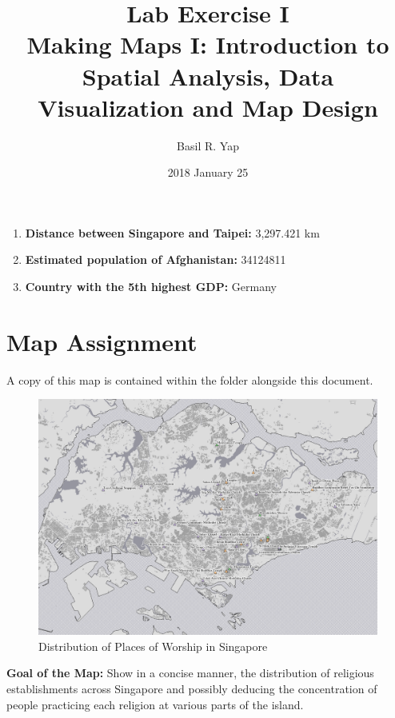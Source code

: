 \documentclass[a4paper, fleqn]{article}
\begin{document}
\title{Lab Exercise I \\ Making Maps I: Introduction to Spatial Analysis, Data Visualization and Map Design}
\author{Basil R. Yap}
\date{2018 January 25}
\maketitle

\begin{enumerate}

\item \textbf{Distance between Singapore and Taipei: }3,297.421 km
\item \textbf{Estimated population of Afghanistan: }34124811
\item \textbf{Country with the 5th highest GDP: }Germany

\end{enumerate}

\pagebreak

\section{Map Assignment}
A copy of this map is contained within the folder alongside this document.
\begin{figure}[h!]
\includegraphics[width=\linewidth]{assets/201801311741.png}
\caption{Distribution of Places of Worship in Singapore}
\label{fig:map1}
\end{figure}

\textbf{Goal of the Map: }Show in a concise manner, the distribution of religious establishments across Singapore and possibly deducing the concentration of people practicing each religion at various parts of the island.\\
\end{document}
